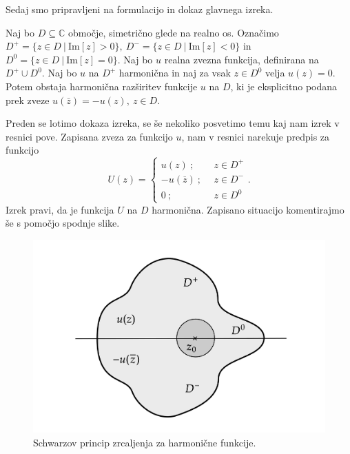 \documentclass[mat1, tisk]{fmfdelo}
\begin{document}
    Sedaj smo pripravljeni na formulacijo in dokaz glavnega izreka.
    
    \begin{izrek}
        \label{schwarz_harm}
        Naj bo $D \subseteq \mathbb{C}$ območje, simetrično glede na realno os. 
        Označimo $D^{+} = \{z \in D~|~\text{Im}[z] > 0\},~D^{-} = \{z \in D~|~\text{Im}[z] < 0\}$ in $D^{0} = \{z \in D~|~\text{Im}[z] = 0\}$.
        Naj bo $u$ realna zvezna funkcija, definirana na $D^{+} \cup D^0$. Naj bo $u$ na $D^{+}$ harmonična in naj za vsak $z \in D^0$ velja $u(z) = 0$.
        Potem obstaja harmonična razširitev funkcije $u$ na $D$, ki je eksplicitno podana prek zveze $u(\bar{z}) = - u(z),~z \in D$.
    \end{izrek}
    \begin{opomba}
        \label{op_spz}
        Preden se lotimo dokaza izreka, se še nekoliko posvetimo temu kaj nam izrek v resnici pove. 
        Zapisana zveza za funkcijo $u$, nam v resnici narekuje predpis za funkcijo
        $$
        U(z) = 
        \begin{cases}
            u(z)~;~~&z \in D^{+}\\
            -u(\overline{z})~;~~&z \in D^{-}\\
            0~;~~ &z \in D^0
        \end{cases}
        .
        $$
        Izrek pravi, da je funkcija $U$ na $D$ harmonična.
        Zapisano situacijo komentirajmo še s pomočjo spodnje slike. 
        \begin{figure}[H]
            \begin{center}
                \includegraphics[width = \textwidth]{schwarz_harm.png}
                \caption{Schwarzov princip zrcaljenja za harmonične funkcije.}
            \end{center}    
        \end{figure}


\end{opomba}
\end{document}
